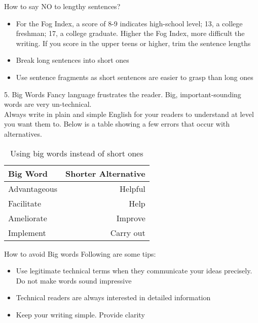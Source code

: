 \documentclass[10pt]{beamer}
\begin{document}
{
	\begin{frame}{How to say NO to lengthy sentences?}
		\begin{itemize}
			\item For the Fog Index, a score of 8-9 indicates high-school level; 13, a college freshman; 17, a college graduate. Higher the Fog Index, more difficult the writing. If you score in the upper teens or higher, trim the sentence lengths
			\item Break long sentences into short ones
			\item Use sentence fragments as short sentences are easier to grasp than long ones 
		\end{itemize}
	\end{frame}
}

{
	\begin{frame}{5. Big Words}
			Fancy language frustrates the reader. Big, important-sounding words are very un-technical. \\ 
			Always write in plain and simple English for your readers to understand at level you want them to. Below is a table showing a few errors that occur with alternatives.
			\begin{table}
				\caption{Using big words instead of short ones}
				\begin{tabular}{lr}
					\toprule
					Big Word & Shorter Alternative\\
					\midrule
					Advantageous & Helpful\\
					Facilitate & Help\\
					Ameliorate & Improve\\
					Implement & Carry out\\
					\bottomrule
				\end{tabular}
			\end{table}		
	\end{frame}
}
{
	\begin{frame}{How to avoid Big words}
		Following are some tips:
		\begin{itemize}
			\item Use legitimate technical terms when they communicate your ideas precisely. Do not make words sound impressive 
			\item Technical readers are always interested in detailed information
			\item Keep your writing simple. Provide clarity 
		\end{itemize}
	\end{frame}
}
\end{document}
